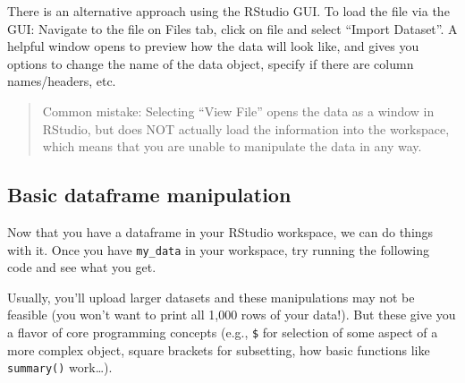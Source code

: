 \documentclass[
]{book}
\newenvironment{Shaded}{\begin{snugshade}}{\end{snugshade}}
\newcommand{\CommentTok}[1]{\textcolor[rgb]{0.56,0.35,0.01}{\textit{#1}}}
\newcommand{\DecValTok}[1]{\textcolor[rgb]{0.00,0.00,0.81}{#1}}
\newcommand{\FunctionTok}[1]{\textcolor[rgb]{0.13,0.29,0.53}{\textbf{#1}}}
\newcommand{\NormalTok}[1]{#1}
\newcommand{\OtherTok}[1]{\textcolor[rgb]{0.56,0.35,0.01}{#1}}
\newcommand{\SpecialCharTok}[1]{\textcolor[rgb]{0.81,0.36,0.00}{\textbf{#1}}}
\newcommand{\StringTok}[1]{\textcolor[rgb]{0.31,0.60,0.02}{#1}}
\begin{document}
There is an alternative approach using the RStudio GUI. To load the file via the GUI: Navigate to the file on Files tab, click on file and select ``Import Dataset''. A helpful window opens to preview how the data will look like, and gives you options to change the name of the data object, specify if there are column names/headers, etc.

\begin{quote}
Common mistake: Selecting ``View File'' opens the data as a window in RStudio, but does NOT actually load the information into the workspace, which means that you are unable to manipulate the data in any way.
\end{quote}

\subsection{Basic dataframe manipulation}\label{basic-dataframe-manipulation}

Now that you have a dataframe in your RStudio workspace, we can do things with it. Once you have \texttt{my\_data} in your workspace, try running the following code and see what you get.

\begin{Shaded}
\end{Shaded}

Usually, you'll upload larger datasets and these manipulations may not be feasible (you won't want to print all 1,000 rows of your data!). But these give you a flavor of core programming concepts (e.g., \texttt{\$} for selection of some aspect of a more complex object, square brackets for subsetting, how basic functions like \texttt{summary()} work\ldots).
\end{document}
